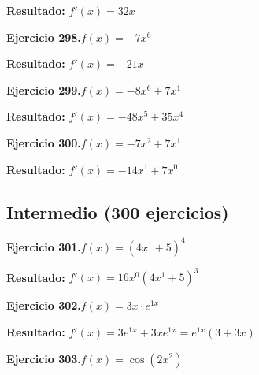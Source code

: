 \documentclass[10pt,a4paper]{article}
\begin{document}
\begin{solbox}
\textbf{Resultado:} \(\displaystyle f'(x) = 32x\)
\end{solbox}

\newpage
\begin{ejbox}
\textbf{Ejercicio 298.}\quad $f(x) = -7x^{6}$
\end{ejbox}

\begin{solbox}
\textbf{Resultado:} \(\displaystyle f'(x) = -21x\)
\end{solbox}

\begin{ejbox}
\textbf{Ejercicio 299.}\quad $f(x) = -8x^{6} + 7x^{1}$
\end{ejbox}

\begin{solbox}
\textbf{Resultado:} \(\displaystyle f'(x) = -48x^{5} + 35x^{4}\)
\end{solbox}

\begin{ejbox}
\textbf{Ejercicio 300.}\quad $f(x) = -7x^{2} + 7x^{1}$
\end{ejbox}

\begin{solbox}
\textbf{Resultado:} \(\displaystyle f'(x) = -14x^{1} + 7x^{0}\)
\end{solbox}

\newpage
\newpage
\subsection{Intermedio (300 ejercicios)}

\begin{ejbox}
\textbf{Ejercicio 301.}\quad $f(x) = (4x^{1} +5)^{4}$
\end{ejbox}

\begin{solbox}
\textbf{Resultado:} \(\displaystyle f'(x) = 16x^{0}(4x^{1} +5)^{3}\)
\end{solbox}

\begin{ejbox}
\textbf{Ejercicio 302.}\quad $f(x) = 3x \cdot e^{1x}$
\end{ejbox}

\begin{solbox}
\textbf{Resultado:} \(\displaystyle f'(x) = 3e^{1x} + 3xe^{1x} = e^{1x}(3 + 3x)\)
\end{solbox}

\begin{ejbox}
\textbf{Ejercicio 303.}\quad $f(x) = \cos(2x^{2})$
\end{ejbox}
\end{document}
